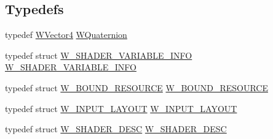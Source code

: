 \subsection*{Typedefs}
\begin{DoxyCompactItemize}
\item 
typedef \hyperlink{class_w_vector4}{W\+Vector4} \hyperlink{group__engineclass_ga717cc687f6844e7a4a2de4948b96c6ef}{W\+Quaternion}
\item 
typedef struct \hyperlink{struct_w___s_h_a_d_e_r___v_a_r_i_a_b_l_e___i_n_f_o}{W\+\_\+\+S\+H\+A\+D\+E\+R\+\_\+\+V\+A\+R\+I\+A\+B\+L\+E\+\_\+\+I\+N\+FO} \hyperlink{group__engineclass_gac58914f40a8d012635bf7704c3a74409}{W\+\_\+\+S\+H\+A\+D\+E\+R\+\_\+\+V\+A\+R\+I\+A\+B\+L\+E\+\_\+\+I\+N\+FO}
\item 
typedef struct \hyperlink{struct_w___b_o_u_n_d___r_e_s_o_u_r_c_e}{W\+\_\+\+B\+O\+U\+N\+D\+\_\+\+R\+E\+S\+O\+U\+R\+CE} \hyperlink{group__engineclass_gafbfee122f0f44bd16c3369f295e95aae}{W\+\_\+\+B\+O\+U\+N\+D\+\_\+\+R\+E\+S\+O\+U\+R\+CE}
\item 
typedef struct \hyperlink{struct_w___i_n_p_u_t___l_a_y_o_u_t}{W\+\_\+\+I\+N\+P\+U\+T\+\_\+\+L\+A\+Y\+O\+UT} \hyperlink{group__engineclass_ga4da83d88937c92af31c7178c6dd76b7a}{W\+\_\+\+I\+N\+P\+U\+T\+\_\+\+L\+A\+Y\+O\+UT}
\item 
typedef struct \hyperlink{struct_w___s_h_a_d_e_r___d_e_s_c}{W\+\_\+\+S\+H\+A\+D\+E\+R\+\_\+\+D\+E\+SC} \hyperlink{group__engineclass_gae87c08a1640684c24a55606a8700fb5c}{W\+\_\+\+S\+H\+A\+D\+E\+R\+\_\+\+D\+E\+SC}
\end{DoxyCompactItemize}
